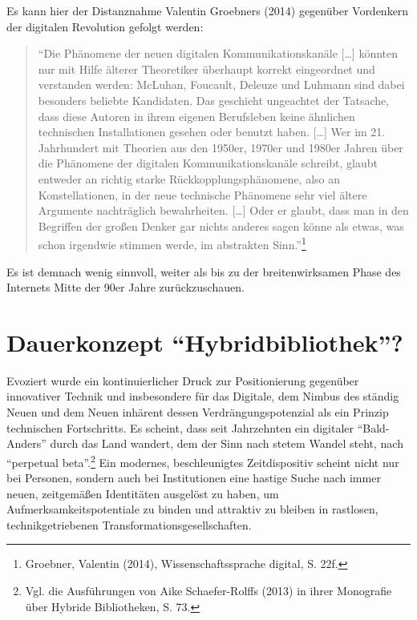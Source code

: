 \documentclass[a4paper,
fontsize=11pt,
oneside,
numbers=noperiodatend,
parskip=half-,
bibliography=totoc,
final
]{scrartcl}
\begin{document}
Es kann hier der Distanznahme Valentin Groebners (2014) gegenüber
Vordenkern der digitalen Revolution gefolgt werden:

\begin{quote}
\enquote{Die Phänomene der neuen digitalen Kommunikationskanäle
{[}\ldots{}{]} könnten nur mit Hilfe älterer Theoretiker überhaupt
korrekt eingeordnet und verstanden werden: McLuhan, Foucault, Deleuze
und Luhmann sind dabei besonders beliebte Kandidaten. Das geschieht
ungeachtet der Tatsache, dass diese Autoren in ihrem eigenen Berufsleben
keine ähnlichen technischen Installationen gesehen oder benutzt haben.
{[}\ldots{}{]} Wer im 21. Jahrhundert mit Theorien aus den 1950er,
1970er und 1980er Jahren über die Phänomene der digitalen
Kommunikationskanäle schreibt, glaubt entweder an richtig starke
Rückkopplungsphänomene, also an Konstellationen, in der neue technische
Phänomene sehr viel ältere Argumente nachträglich bewahrheiten.
{[}\ldots{}{]} Oder er glaubt, dass man in den Begriffen der großen
Denker gar nichts anderes sagen könne als etwas, was schon irgendwie
stimmen werde, im abstrakten Sinn.}\footnote{Groebner, Valentin (2014),
  Wissenschaftssprache digital, S. 22f.}
\end{quote}

Es ist demnach wenig sinnvoll, weiter als bis zu der breitenwirksamen
Phase des Internets Mitte der 90er Jahre zurückzuschauen.

\section*{\texorpdfstring{Dauerkonzept
\enquote{Hybridbibliothek}?}{Dauerkonzept Hybridbibliothek?}}\label{dauerkonzept-hybridbibliothek}

Evoziert wurde ein kontinuierlicher Druck zur Positionierung gegenüber
innovativer Technik und insbesondere für das Digitale, dem Nimbus des
ständig Neuen und dem Neuen inhärent dessen Verdrängungspotenzial als
ein Prinzip technischen Fortschritts. Es scheint, dass seit Jahrzehnten
ein digitaler \enquote{Bald-Anders} durch das Land wandert, dem der Sinn
nach stetem Wandel steht, nach \enquote{perpetual beta}.\footnote{Vgl.
  die Ausführungen von Aike Schaefer-Rolffs (2013) in ihrer Monografie
  über Hybride Bibliotheken, S. 73.} Ein modernes, beschleunigtes
Zeitdispositiv scheint nicht nur bei Personen, sondern auch bei
Institutionen eine hastige Suche nach immer neuen, zeitgemäßen
Identitäten ausgelöst zu haben, um Aufmerksamkeitspotentiale zu binden
und attraktiv zu bleiben in rastlosen, technikgetriebenen
Transformationsgesellschaften.
\end{document}
